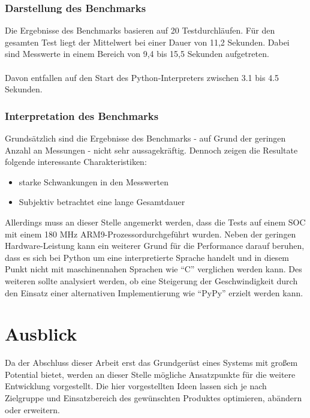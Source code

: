 \documentclass[Bachelorarbeit.tex]{subfiles}
\begin{document}
\subsubsection*{Darstellung des Benchmarks}
Die Ergebnisse des Benchmarks basieren auf 20 Testdurchläufen. 
Für den gesamten Test liegt der Mittelwert bei einer Dauer von 11,2 Sekunden. 
Dabei sind Messwerte in einem Bereich von 9,4 bis 15,5 Sekunden aufgetreten.\\
\\
Davon entfallen auf den Start des Python-Interpreters zwischen 3.1 bis 4.5 Sekunden.

\subsubsection*{Interpretation des Benchmarks}
Grundsätzlich sind die Ergebnisse des Benchmarks - auf Grund der geringen Anzahl an Messungen - nicht sehr aussagekräftig. Dennoch zeigen die Resultate folgende interessante Charakteristiken:
\begin{itemize}
\item starke Schwankungen in den Messwerten
\item Subjektiv betrachtet eine lange Gesamtdauer
\end{itemize}
Allerdings muss an dieser Stelle angemerkt werden, dass die Tests auf einem \ac{SOC} mit einem 180 MHz \ac{ARM}9-Prozessordurchgeführt wurden. 
Neben der geringen Hardware-Leistung kann ein weiterer Grund für die Performance darauf beruhen, dass es sich bei Python um eine interpretierte Sprache handelt und in diesem Punkt nicht mit maschinennahen Sprachen wie "`C"' verglichen werden kann. 
Des weiteren sollte analysiert werden, ob eine Steigerung der Geschwindigkeit durch den Einsatz einer alternativen Implementierung wie "`PyPy"' \parencite[vgl.][]{pypy_speedtest} erzielt werden kann.

\section{Ausblick}
\label{sec:ausblick}
Da der Abschluss dieser Arbeit erst das Grundgerüst eines Systems mit großem Potential bietet, werden an dieser Stelle mögliche Ansatzpunkte für die weitere Entwicklung vorgestellt. 
Die hier vorgestellten Ideen lassen sich je nach Zielgruppe und Einsatzbereich des gewünschten Produktes optimieren, abändern oder erweitern. 
\end{document}
